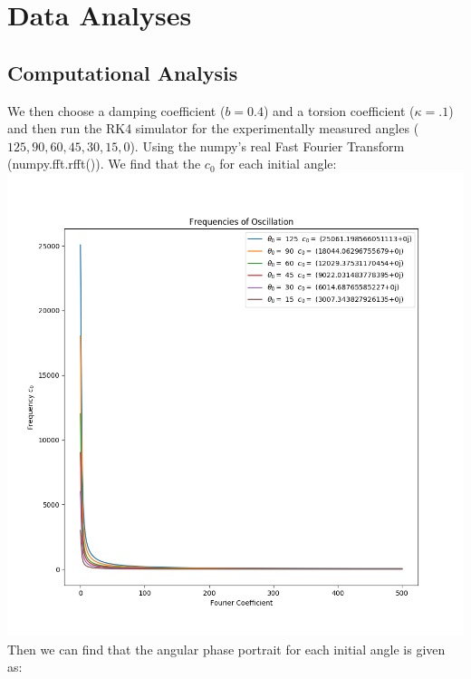 \section{Data Analyses} \label{sec:Data Analyses}
    \subsection{Computational Analysis}
        We then choose a damping coefficient ($b=0.4$) and a torsion coefficient ($\kappa = .1$) and then run the RK4 simulator for the experimentally measured angles ($125, 90, 60, 45, 30, 15, 0$). Using the numpy's real Fast Fourier Transform (numpy.fft.rfft()). We find that the $c_0$ for each initial angle: 
        \includegraphics[width=\linewidth]{figures/Figure 3 - Angular Frequancies .png}
        Then we can find that the angular phase portrait for each initial angle is given as: 
